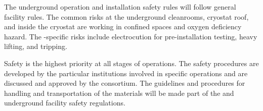 The underground operation and installation safety rules will follow general facility rules. The common risks at the underground cleanrooms, cryostat roof, and inside the cryostat are working in confined spaces and oxygen deficiency hazard. The  -specific risks include electrocution for pre-installation testing, heavy lifting, and tripping.

Safety is the highest priority at all stages of    operations. The safety procedures are developed by the particular institutions involved in specific operations and are discussed and approved by the consortium. The guidelines and procedures for handling and transportation of the    materials will be made part of the  and underground facility safety regulations.